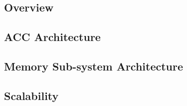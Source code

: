 

\subsection{Overview}
\label{sec:overview}


\subsection{ACC Architecture}
\label{sec:processing}


\subsection{Memory Sub-system Architecture}
\label{sec:memory}


\subsection{Scalability}
\label{sec:scale}

